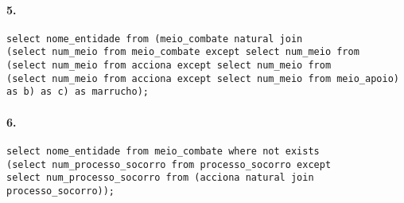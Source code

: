 \documentclass[10pt,a4paper]{article}
\begin{document}
\paragraph{5.}
\begin{verbatim}
select nome_entidade from (meio_combate natural join 
(select num_meio from meio_combate except select num_meio from  
(select num_meio from acciona except select num_meio from 
(select num_meio from acciona except select num_meio from meio_apoio) as b) as c) as marrucho);
\end{verbatim}

\paragraph{6.}
\begin{verbatim}
select nome_entidade from meio_combate where not exists 
(select num_processo_socorro from processo_socorro except 
select num_processo_socorro from (acciona natural join processo_socorro));
\end{verbatim}
\end{document}
